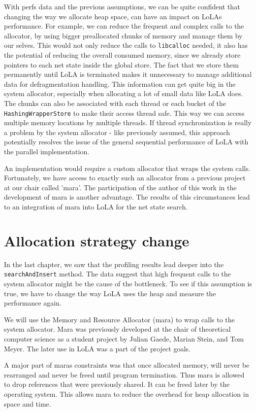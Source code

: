 With perfs data and the previous assumptions, we can be quite confident that changing the way we allocate heap space, can have an impact on LoLAs performance. For example, we can reduce the frequent and complex calls to the allocator, by using bigger preallocated chunks of memory and manage them by our selves. This would not only reduce the calls to \texttt{libcalloc} needed, it also has the potential of reducing the overall consumed memory, since we already store pointers to each net state inside the global store. The fact that we store them permanently until LoLA is terminated makes it unnecessary to manage additional data for defragmentation handling. This information can get quite big in the system allocator, especially when allocating a lot of small data like LoLA does. The chunks can also be associated with each thread or each bucket of the \texttt{Hashing\-Wrapper\-Store} to make their access thread safe. This way we can access multiple memory locations by multiple threads. If thread synchronization is really a problem by the system allocator - like previously assumed, this approach potentially resolves the issue of the general sequential performance of LoLA with the parallel implementation.

An implementation would require a custom allocator that wraps the system calls. Fortunately, we have access to exactly such an allocator from a previous project at our chair called 'mara'. The participation of the author of this work in the development of mara is another advantage. The results of this circumstances lead to an integration of mara into LoLA for the net state search.

\section{Allocation strategy change}
In the last chapter, we saw that the profiling results lead deeper into the \texttt{search\-And\-Insert} method. The data suggest that high frequent calls to the system allocator might be the cause of the bottleneck. To see if this assumption is true, we have to change the way LoLA uses the heap and measure the performance again.

We will use the Memory and Resource Allocator (mara) to wrap calls to the system allocator. Mara was previously developed at the chair of theoretical computer science as a student project by Julian Gaede, Marian Stein, and Tom Meyer. The later use in LoLA was a part of the project goals.

A major part of maras constraints was that once allocated memory, will never be rearranged and never be freed until program termination. Thus mara is allowed to drop references that were previously shared. It can be freed later by the operating system. This allows mara to reduce the overhead for heap allocation in space and time.

